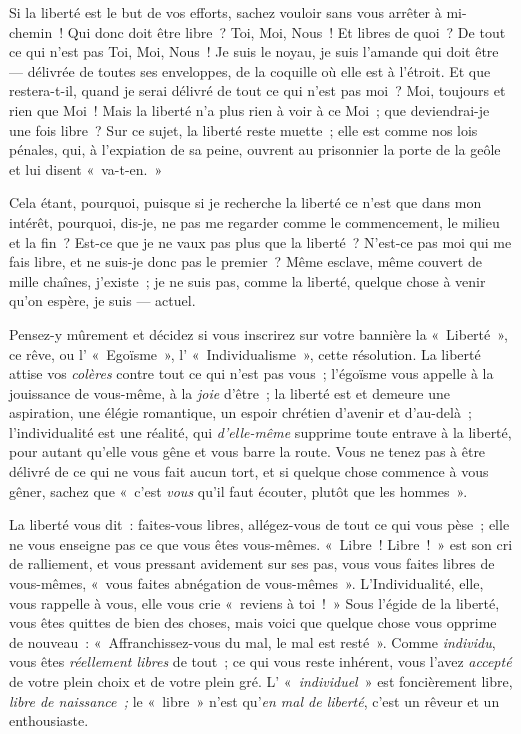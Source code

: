 \documentclass[french,twoside]{book} %
\begin{document}
Si la liberté est le but de vos efforts, sachez vouloir sans vous arrêter à mi-chemin ! Qui donc doit être libre ? Toi, Moi, Nous ! Et libres de quoi ? De tout ce qui n’est pas Toi, Moi, Nous ! Je suis le noyau, je suis l’amande qui doit être — délivrée de toutes ses enveloppes, de la coquille où elle est à l’étroit. Et que restera-t-il, quand je serai délivré de tout ce qui n’est pas moi ? Moi, toujours et rien que Moi ! Mais la liberté n’a plus rien à voir à ce Moi ; que deviendrai-je une fois libre ? Sur ce sujet, la liberté reste muette ; elle est comme nos lois pénales, qui, à l’expiation de sa peine, ouvrent au prisonnier la porte de la geôle et lui disent « va-t-en. »\par
Cela étant, pourquoi, puisque si je recherche la liberté ce n’est que dans mon intérêt, pourquoi, dis-je, ne pas me regarder comme le commencement, le milieu et la fin ? Est-ce que je ne vaux pas plus que la liberté ? N’est-ce pas moi qui me fais libre, et ne suis-je donc pas le premier ? Même esclave, même couvert de mille chaînes, j’existe ; je ne suis pas, comme la liberté, quelque chose à venir qu’on espère, je suis — actuel.\par
Pensez-y mûrement et décidez si vous inscrirez sur votre bannière la « Liberté », ce rêve, ou l’ « Egoïsme », l’ « Individualisme », cette résolution. La liberté attise vos \emph{colères} contre tout ce qui n’est pas vous ; l’égoïsme vous appelle à la jouissance de vous-même, à la \emph{joie} d’être ; la liberté est et demeure une aspiration, une élégie romantique, un espoir chrétien d’avenir et d’au-delà ; l’individualité est une réalité, qui \emph{d’elle-même} supprime toute entrave à la liberté, pour autant qu’elle vous gêne et vous barre la route. Vous ne tenez pas à être délivré de ce qui ne vous fait aucun tort, et si quelque chose commence à vous gêner, sachez que « c’est \emph{vous} qu’il faut écouter, plutôt que les hommes ».\par
 La liberté vous dit : faites-vous libres, allégez-vous de tout ce qui vous pèse ; elle ne vous enseigne pas ce que vous êtes vous-mêmes. « Libre ! Libre ! » est son cri de ralliement, et vous pressant avidement sur ses pas, vous vous faites libres de vous-mêmes, « vous faites abnégation de vous-mêmes ». L’Individualité, elle, vous rappelle à vous, elle vous crie « reviens à toi ! » Sous l’égide de la liberté, vous êtes quittes de bien des choses, mais voici que quelque chose vous opprime de nouveau : « Affranchissez-vous du mal, le mal est resté ». Comme \emph{individu}, vous êtes \emph{réellement libres} de tout ; ce qui vous reste inhérent, vous l’avez \emph{accepté} de votre plein choix et de votre plein gré. L’ « \emph{individuel} » est foncièrement libre, \emph{libre de naissance ;} le « libre » n’est qu’\emph{en mal de liberté}, c’est un rêveur et un enthousiaste.\par
\end{document}
